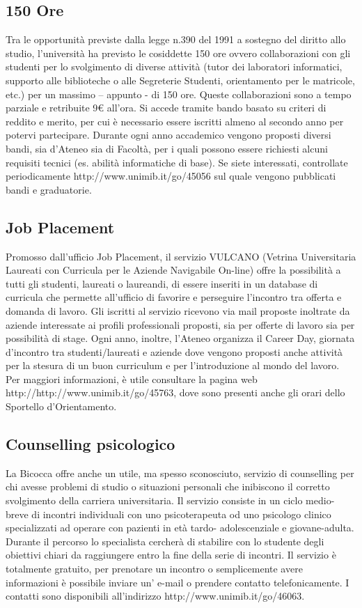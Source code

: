 \subsection{150 Ore}
Tra le opportunità previste dalla legge n.390 del 1991 a sostegno del diritto allo studio, l'università ha previsto le cosiddette 150 ore ovvero collaborazioni con gli studenti per lo svolgimento di diverse attività (tutor dei laboratori informatici, supporto alle biblioteche o alle Segreterie Studenti, orientamento per le matricole, etc.) per un massimo – appunto - di 150 ore. Queste collaborazioni sono a tempo parziale e retribuite 9€ all'ora. Si accede tramite bando basato su criteri di reddito e merito, per cui è necessario essere iscritti almeno al secondo anno per potervi partecipare. Durante ogni anno accademico vengono proposti diversi bandi, sia d'Ateneo sia di Facoltà, per i quali possono essere richiesti alcuni requisiti tecnici (es. abilità informatiche di base). Se siete interessati, controllate periodicamente http://www.unimib.it/go/45056 sul quale vengono pubblicati bandi e graduatorie.

\subsection{Job Placement}
Promosso dall'ufficio Job Placement, il servizio VULCANO (Vetrina Universitaria Laureati con Curricula per le Aziende Navigabile On-line) offre la possibilità a tutti gli studenti, laureati o laureandi, di essere inseriti in un database di curricula che permette all'ufficio di favorire e perseguire l'incontro tra offerta e domanda di lavoro. Gli iscritti al servizio ricevono via mail proposte inoltrate da aziende interessate ai profili professionali proposti, sia per offerte di lavoro sia per possibilità di stage.
Ogni anno, inoltre, l'Ateneo organizza il Career Day, giornata d'incontro tra studenti/laureati e aziende dove vengono proposti anche attività per la stesura di un buon curriculum e per l'introduzione al mondo del lavoro.
Per maggiori informazioni, è utile consultare la pagina web http://http://www.unimib.it/go/45763, dove sono presenti anche gli orari dello Sportello d'Orientamento.
 
\subsection{Counselling psicologico}
La Bicocca offre anche un utile, ma spesso sconosciuto, servizio di counselling per chi avesse problemi di studio o situazioni personali che inibiscono il corretto svolgimento della carriera universitaria. Il servizio consiste in un ciclo medio-breve di incontri individuali con uno psicoterapeuta od uno psicologo clinico specializzati ad operare con pazienti in età tardo- adolescenziale e giovane-adulta. Durante il percorso lo specialista cercherà di stabilire con lo studente degli obiettivi chiari da raggiungere entro la fine della serie di incontri.
Il servizio è totalmente gratuito, per prenotare un incontro o semplicemente avere informazioni è possibile inviare un' e-mail o prendere contatto telefonicamente. I contatti sono disponibili all'indirizzo http://www.unimib.it/go/46063.

